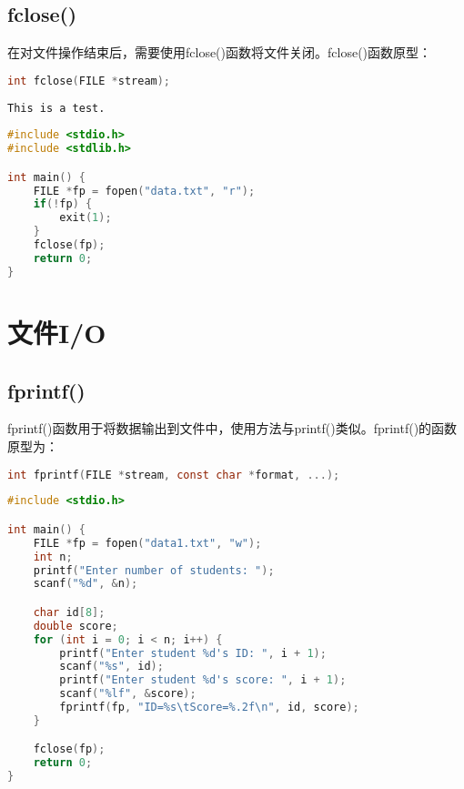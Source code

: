\vspace{0.5cm}

\subsection{fclose()}

在对文件操作结束后，需要使用fclose()函数将文件关闭。fclose()函数原型：

\vspace{-0.5cm}

\begin{lstlisting}[language=C]
int fclose(FILE *stream);
\end{lstlisting}

\vspace{0.5cm}


\begin{lstlisting}[title=data.txt]
This is a test.
\end{lstlisting}

\begin{lstlisting}[language=C]
#include <stdio.h>
#include <stdlib.h>

int main() {
    FILE *fp = fopen("data.txt", "r");
    if(!fp) {
        exit(1);
    }
    fclose(fp);
    return 0;
}
\end{lstlisting}

\newpage

\section{文件I/O}

\subsection{fprintf()}

fprintf()函数用于将数据输出到文件中，使用方法与printf()类似。fprintf()的函数原型为：

\vspace{-0.5cm}

\begin{lstlisting}[language=C]
int fprintf(FILE *stream, const char *format, ...);
\end{lstlisting}

\vspace{0.5cm}


\begin{lstlisting}[language=C]
#include <stdio.h>

int main() {
    FILE *fp = fopen("data1.txt", "w");
    int n;
    printf("Enter number of students: ");
    scanf("%d", &n);

    char id[8];
    double score;
    for (int i = 0; i < n; i++) {
        printf("Enter student %d's ID: ", i + 1);
        scanf("%s", id);
        printf("Enter student %d's score: ", i + 1);
        scanf("%lf", &score);
        fprintf(fp, "ID=%s\tScore=%.2f\n", id, score);
    }

    fclose(fp);
    return 0;
}
\end{lstlisting}

